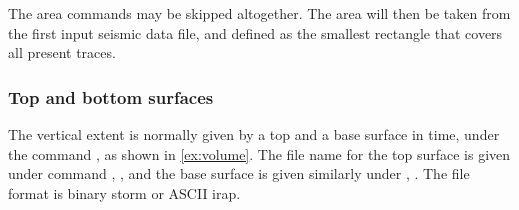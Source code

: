The area commands may be skipped altogether. The area will then be taken from the first input seismic data file, and defined as the smallest rectangle that covers all present traces.

\subsubsection{Top and bottom surfaces}
The vertical extent is normally given by a top and a base surface in time, under the command , as shown in \autoref{ex:volume}. The file name for the top surface is given under command , , and the base surface is given similarly under , . The file format is binary storm or ASCII irap.

